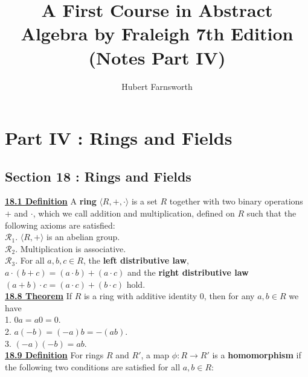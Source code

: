 \documentclass[12pt, letterpaper]{article}
\begin{document}
\title{A First Course in Abstract Algebra by Fraleigh 7th Edition (Notes Part IV)}
\author{Hubert Farnsworth }  
\begin{titlepage}
\maketitle
\end{titlepage}
 

 
\section{Part IV : Rings and Fields}


\subsection{Section 18 : Rings and Fields}


\noindent \underline{\bf 18.1 Definition} A {\bf ring} $\langle R, +, \cdot \rangle$ is a set $R$ together with two binary operations $+$ and $\cdot$, which we call addition and multiplication, defined on $R$ such that the following axioms are satisfied: \\

$\mathscr{R}_1$. $\langle R, + \rangle$ is an abelian group. \\

$\mathscr{R}_2$. Multiplication is associative. \\

$\mathscr{R}_3$. For all $a,b,c \in R$, the {\bf left distributive law}, $a \cdot (b + c) = (a\cdot b) + (a\cdot c)$ and the {\bf right distributive law} $(a+b) \cdot c = (a\cdot c) + (b \cdot c)$ hold. \\

\noindent \underline{\bf 18.8 Theorem} If $R$ is a ring with additive identity $0$, then for any $a,b \in R$ we have \\

1. $0a = a0 = 0$. \\

2. $a(-b) = (-a)b = -(ab)$. \\

3. $(-a)(-b) = ab$. \\

\noindent \underline{\bf 18.9 Definition} For rings $R$ and $R'$, a map $\phi : R \rightarrow R'$ is a {\bf homomorphism} if the following two conditions are satisfied for all $a,b \in R$: \\
\end{document}
